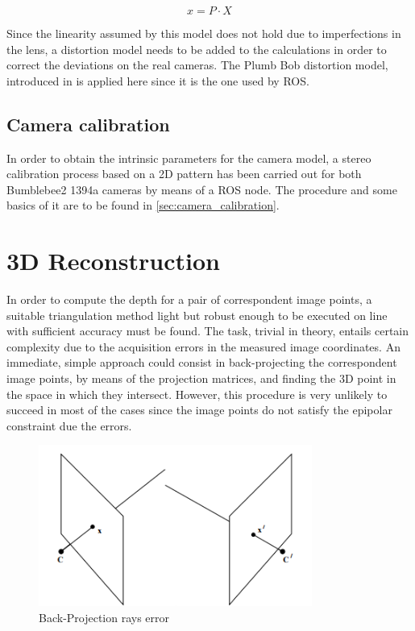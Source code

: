 \begin{equation}
x = P \cdot X
\label{eq:pinhole_model}
\end{equation}

Since the linearity assumed by this model does not hold due to imperfections in the lens, a distortion model needs to be added to the calculations in order to correct the deviations on the real cameras.
The Plumb Bob distortion model, introduced in \cite{Brown} is applied here since it is the one used by ROS.


\subsection{Camera calibration}
\label{sec:cam_calib}
In order to obtain the intrinsic parameters for the camera model, a stereo calibration process based on a 2D pattern has been carried out for both Bumblebee2 1394a cameras by means of a ROS node. The procedure and some basics of it are to be found in \ref{sec:camera_calibration}.

\section{3D Reconstruction}
In order to compute the depth for a pair of correspondent image points, a suitable triangulation method light but robust enough to be executed on line with sufficient accuracy must be found.
The task, trivial in theory, entails certain complexity due to the acquisition errors in the measured image coordinates.
An immediate, simple approach could consist in back-projecting the correspondent image points, by means of the projection matrices, and finding the 3D point in the space in which they intersect.
However, this procedure is very unlikely to succeed in most of the cases since the image points do not satisfy the epipolar constraint due the errors.

\begin{figure}[h]
    \centering
    \includegraphics[width=0.8\textwidth]{figures/back_projection}
    \caption{Back-Projection rays error}
    \label{fig:Back-Projection}
\end{figure}

